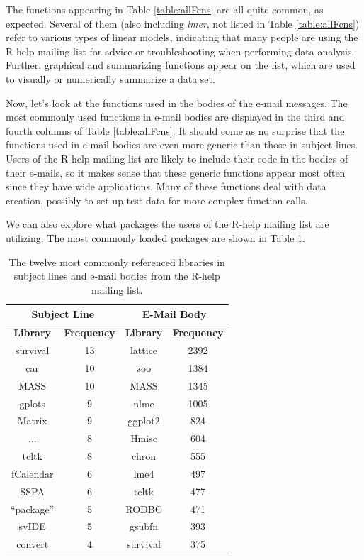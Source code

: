 \documentclass[12pt, a4paper, oneside]{amsart}
\begin{document}
The functions appearing in Table \ref{table:allFcns} are all quite common, as expected.  Several of them (also including \textit{lmer}, not listed in Table \ref{table:allFcns}) refer to various types of linear models, indicating that many people are using the R-help mailing list for advice or troubleshooting when performing data analysis.  Further, graphical and summarizing functions appear on the list, which are used to visually or numerically summarize a data set.

Now, let's look at the functions used in the bodies of the e-mail messages.  The most commonly used functions in e-mail bodies are displayed in the third and fourth columns of Table \ref{table:allFcns}.  It should come as no surprise that the functions used in e-mail bodies are even more generic than those in subject lines.  Users of the R-help mailing list are likely to include their code in the bodies of their e-mails, so it makes sense that these generic functions appear most often since they have wide applications.  Many of these functions deal with data creation, possibly to set up test data for more complex function calls.

We can also explore what packages the users of the R-help mailing list are utilizing.  The most commonly loaded packages are shown in Table \ref{table:allLibs}.

 \begin{table}[ht]
 \centering
 \begin{tabular}{|c|c||c|c|}
 \hline
\multicolumn{2}{|c||}{Subject Line} & \multicolumn{2}{|c|}{E-Mail Body}\\
\hline
\footnotesize{\textbf{Library}}& \footnotesize{\textbf{Frequency}} & \footnotesize{\textbf{Library}}& \footnotesize{\textbf{Frequency}}\\
\hline
survival & 13 & lattice & 2392 \\
car &10 & zoo & 1384\\
MASS & 10 & MASS & 1345\\
gplots & 9 & nlme & 1005\\
Matrix & 9 & ggplot2 & 824\\
... & 8 & Hmisc & 604\\
tcltk & 8 & chron & 555\\
fCalendar & 6 & lme4 & 497\\
SSPA & 6 & tcltk & 477\\
``package'' & 5 & RODBC & 471\\
svIDE & 5 & gsubfn & 393\\
convert & 4 & survival & 375\\
\hline
\end{tabular}
\caption{The twelve most commonly referenced libraries in subject lines and e-mail bodies from the R-help mailing list.}
\label{table:allLibs}
\end{table} 
\end{document}
